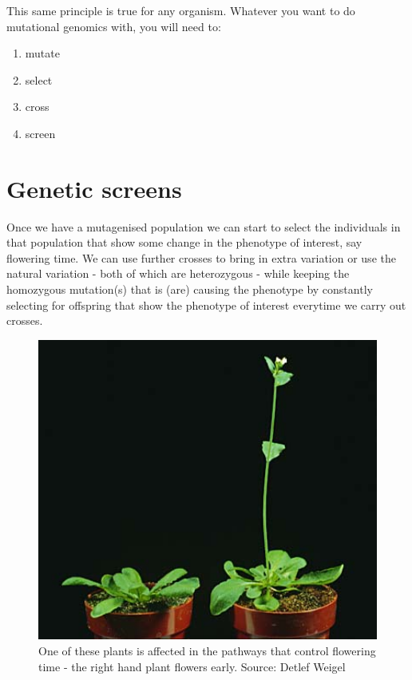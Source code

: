 \documentclass[12pt,]{book}
\providecommand{\tightlist}{%
  \setlength{\itemsep}{0pt}\setlength{\parskip}{0pt}}
\begin{document}
This same principle is true for any organism. Whatever you want to do
mutational genomics with, you will need to:

\begin{enumerate}
\def\labelenumi{\arabic{enumi}.}
\tightlist
\item
  mutate
\item
  select
\item
  cross
\item
  screen
\end{enumerate}

\section{Genetic screens}\label{genetic-screens}

Once we have a mutagenised population we can start to select the
individuals in that population that show some change in the phenotype of
interest, say flowering time. We can use further crosses to bring in
extra variation or use the natural variation - both of which are
heterozygous - while keeping the homozygous mutation(s) that is (are)
causing the phenotype by constantly selecting for offspring that show
the phenotype of interest everytime we carry out crosses.





\begin{figure}
\includegraphics[width=5.47in]{assets/tall_plant} \caption{One of these plants is affected in the pathways that
control flowering time - the right hand plant flowers early. Source:
Detlef Weigel}\label{fig:tallplant}
\end{figure}
\end{document}
